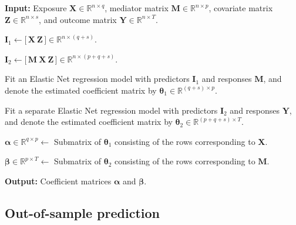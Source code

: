 \documentclass[
  12pt]{article}
\begin{document}
\begin{algorithm}[ht]
\caption{Estimation of Indirect Effects in a Many-to-Many-to-Many Mediation Model}
\label{alg:MMM}
\begin{algorithmic}[1]

\State \textbf{Input:}
Exposure $\mathbf X \in \mathbb{R}^{n \times q}$,
mediator matrix $\mathbf M \in \mathbb{R}^{n \times p}$,
covariate matrix $\mathbf Z \in \mathbb{R}^{n \times s}$,
and outcome matrix $\mathbf Y \in \mathbb{R}^{n \times T}$.

\State
$
\mathbf I_1 \leftarrow \bigl[\, \mathbf X \ \mathbf Z \,\bigr] \in \mathbb{R}^{n \times (q+s)} .
$

\State
$
\mathbf I_2 \leftarrow \bigl[\, \mathbf M \ \mathbf X \ \mathbf Z \,\bigr] \in \mathbb{R}^{n \times (p+q+s)} .
$

\State Fit an Elastic Net regression model with predictors $\mathbf I_1$ and responses $\mathbf M$, and denote the estimated coefficient matrix by
$
\bm \theta_1 \in \mathbb{R}^{(q+s) \times p}.
$

\State Fit a separate Elastic Net regression model with predictors $\mathbf I_2$ and responses $\mathbf Y$, and denote the estimated coefficient matrix by
$
\bm \theta_2 \in \mathbb{R}^{(p+q+s) \times T}.
$

\State $\bm \alpha \in \mathbb{R}^{q \times p}\leftarrow$ Submatrix of
$\bm \theta_1$ consisting of the rows corresponding to $\mathbf X$.

\State  $\bm \beta \in \mathbb{R}^{p \times T}\leftarrow$ Submatrix of
$\bm \theta_2$ consisting of the rows corresponding to $\mathbf M$.


\State \textbf{Output:} Coefficient matrices $\bm \alpha$ and $\bm \beta$.

\end{algorithmic}
\end{algorithm}



\subsection{Out-of-sample prediction}
\label{sec:prediction}
\vspace{-.25em}
\end{document}
